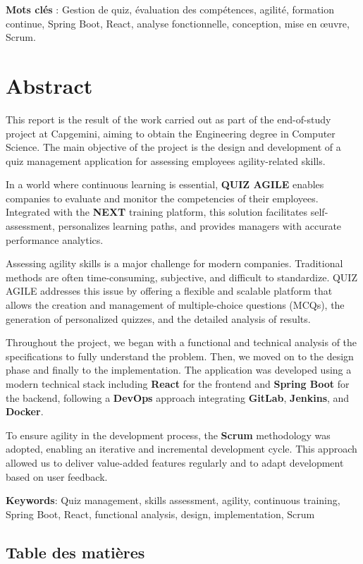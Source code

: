 \documentclass[12pt,a4paper,twoside]{report}
\begin{document}
\textbf{Mots clés} : Gestion de quiz, évaluation des compétences,
agilité, formation continue, Spring Boot, React, analyse fonctionnelle,
conception, mise en œuvre, Scrum.

\chapter{Abstract}

This report is the result of the work carried out as part of the
end-of-study project at Capgemini, aiming to obtain the Engineering
degree in Computer Science. The main objective of the project is the
design and development of a quiz management application for assessing
employees\textquotesingle{} agility-related skills.

In a world where continuous learning is essential, \textbf{QUIZ AGILE}
enables companies to evaluate and monitor the competencies of their
employees. Integrated with the \textbf{NEXT} training platform, this
solution facilitates self-assessment, personalizes learning paths, and
provides managers with accurate performance analytics.

Assessing agility skills is a major challenge for modern companies.
Traditional methods are often time-consuming, subjective, and difficult
to standardize. QUIZ AGILE addresses this issue by offering a flexible
and scalable platform that allows the creation and management of
multiple-choice questions (MCQs), the generation of personalized
quizzes, and the detailed analysis of results.

Throughout the project, we began with a functional and technical
analysis of the specifications to fully understand the problem. Then, we
moved on to the design phase and finally to the implementation. The
application was developed using a modern technical stack including
\textbf{React} for the frontend and \textbf{Spring Boot} for the
backend, following a \textbf{DevOps} approach integrating
\textbf{GitLab}, \textbf{Jenkins}, and \textbf{Docker}.

To ensure agility in the development process, the \textbf{Scrum}
methodology was adopted, enabling an iterative and incremental
development cycle. This approach allowed us to deliver value-added
features regularly and to adapt development based on user feedback.

\textbf{Keywords}: Quiz management, skills assessment, agility,
continuous training, Spring Boot, React, functional analysis, design,
implementation, Scrum

\hypertarget{table-des-matiuxe8res}{%
\section{Table des matières}\label{table-des-matiuxe8res}}
\end{document}
